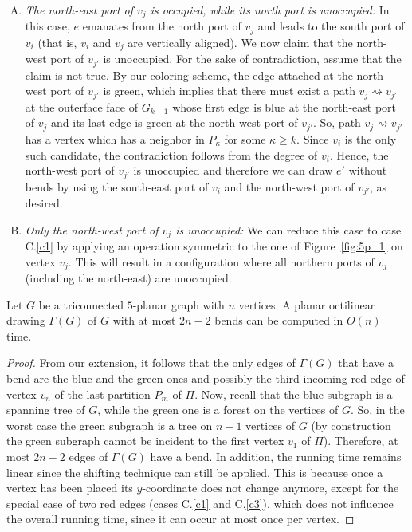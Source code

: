 \documentclass[a4paper,twoside,11pt]{article}
\begin{document}
\begin{enumerate}[C.1:]
\item \label{c2} \emph{The north-east port of $v_j$ is occupied,
while its north port is unoccupied:} In this case, $e$ emanates from
the north port of $v_j$ and leads to the south port of $v_i$ (that
is, $v_i$ and $v_j$ are vertically aligned). We now claim that the
north-west port of $v_{j'}$ is unoccupied. For the sake of
contradiction, assume that the claim is not true. By our coloring
scheme, the edge attached at the north-west port of $v_{j'}$ is
green, which implies that there must exist a path $v_j
\rightsquigarrow v_{j'}$ at the outerface face of $G_{k-1}$ whose
first edge is blue at the north-east port of $v_j$ and its last edge
is green at the north-west port of $v_{j'}$.
So, path $v_j \rightsquigarrow v_{j'}$ has a vertex which has a
neighbor in $P_\kappa$ for some $\kappa \geq k$. Since $v_i$ is the
only such candidate, the contradiction follows from the degree of
$v_i$. Hence, the north-west port of $v_{j'}$ is unoccupied and
therefore we can draw $e'$ without bends by using the south-east
port of $v_i$ and the north-west port of $v_{j'}$, as desired.


\item \label{c3} \emph{Only the north-west port of $v_j$ is
unoccupied:} We can reduce this case to case C.\ref{c1} by applying
an operation symmetric to the one of Figure~\ref{fig:5p_1}  on vertex
$v_j$. This will result in a configuration where all northern ports
of $v_j$ (including the north-east) are unoccupied.
\end{enumerate}

\begin{theorem}
Let $G$ be a triconnected $5$-planar graph with $n$ vertices. A
planar octilinear drawing $\Gamma(G)$ of $G$ with at most $2n-2$
bends can be computed in $O(n)$ time.
\label{thm:5ub}
\end{theorem}
\begin{proof}
From our extension, it follows that the only edges of $\Gamma(G)$
that have a bend are the blue and the green ones and possibly the
third incoming red edge of vertex $v_n$ of the last partition $P_m$
of $\Pi$. Now, recall that the blue subgraph is a spanning tree of
$G$, while the green one is a forest on the vertices of $G$. So, in
the worst case the green subgraph is a tree on $n-1$ vertices of $G$
(by construction the green subgraph cannot be incident to the first
vertex $v_1$ of $\Pi$). Therefore, at most $2n-2$ edges of
$\Gamma(G)$ have a bend.  In addition, the running time remains
linear since the shifting technique can still be applied. This is
because once a vertex has been placed its $y$-coordinate does not
change anymore, except for the special case of two red edges (cases
C.\ref{c1} and C.\ref{c3}), which does not influence the overall
running time, since it can occur at most once per vertex.
\end{proof}
\end{document}
